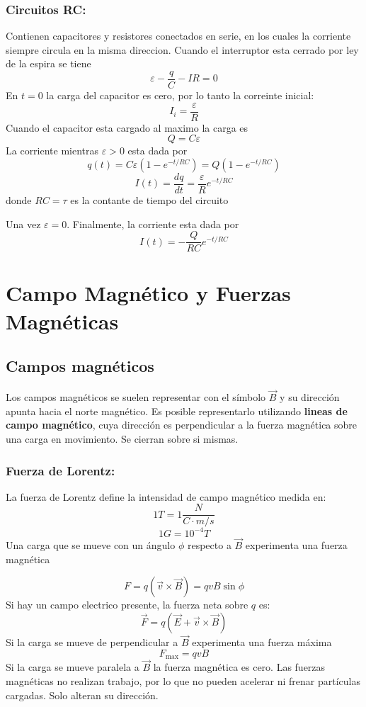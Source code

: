 \documentclass[a4paper, 10pt]{article}
\begin{document}
\begin{multicols*}{2}
	\subsubsection{Circuitos RC: }Contienen capacitores y resistores conectados en serie, en los cuales la corriente siempre circula en la misma direccion.
	Cuando el interruptor esta cerrado por ley de la espira se tiene
	$$\varepsilon -\frac{q}{C}-IR=0$$
	En $t=0$ la carga del capacitor es cero, por lo tanto la correinte inicial:
	$$I_i=\frac{\varepsilon}{R}$$
	Cuando el capacitor esta cargado al maximo la carga es
	$$Q=C\varepsilon$$
	La corriente mientras $\varepsilon > 0$ esta dada por
	$$q(t)=C\varepsilon(1-e^{-t/RC})=Q(1-e^{-t/RC})$$
	$$I(t) = \frac{dq}{dt} = \frac{\varepsilon}{R}e^{-t/RC}$$
	donde $RC=\tau$ es la contante de tiempo del circuito
	    
	Una vez $\varepsilon = 0$.
	Finalmente, la corriente esta dada por
	$$I(t) = -\frac{Q}{RC}e^{-t/RC}$$
	    
	\section{Campo Magnético y Fuerzas Magnéticas}
	\subsection{Campos magnéticos}
	Los campos magnéticos se suelen representar con el símbolo $\vec{B}$ 
  y su dirección apunta hacia el norte magnético.
  Es posible representarlo utilizando \textbf{lineas de campo magnético},
  cuya dirección es perpendicular a la fuerza magnética sobre una carga en movimiento.
  Se cierran sobre si mismas.
	     
	\subsubsection{Fuerza de Lorentz:} La fuerza de Lorentz define la intensidad de campo magnético medida en:
	$$1 T = 1 \frac{N}{C \cdot m/s}$$
	$$1 G = 10^{-4} T$$
	Una carga que se mueve con un ángulo $\phi$ respecto a $\vec{B}$ experimenta una fuerza magnética
	     
	$$F =q(\vec{v}\times\vec{B}) =qvB\sin{\phi} $$
	Si hay un campo electrico presente, la fuerza neta sobre $q$ es:
	$$\vec{F}=q(\vec{E}+\vec{v}\times \vec{B})$$
	Si la carga se mueve de perpendicular a $\vec{B}$ experimenta una fuerza máxima 
	$$F_{\text{max}}=qvB$$
	Si la carga se mueve paralela a $\vec{B}$ la fuerza magnética es cero.
	Las fuerzas magnéticas no realizan trabajo, por lo que no pueden acelerar ni frenar partículas cargadas. Solo alteran su dirección.\\
	     

\end{multicols*}
\end{document}
